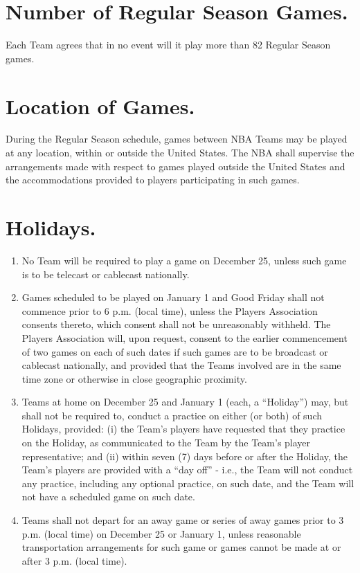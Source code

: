 \documentclass[
]{book}
\providecommand{\tightlist}{%
  \setlength{\itemsep}{0pt}\setlength{\parskip}{0pt}}
\begin{document}
\hypertarget{number-of-regular-season-games.}{%
\section{Number of Regular Season Games.}\label{number-of-regular-season-games.}}

Each Team agrees that in no event will it play more than 82 Regular Season games.

\hypertarget{location-of-games.}{%
\section{Location of Games.}\label{location-of-games.}}

During the Regular Season schedule, games between NBA Teams may be played at any location, within or outside the United States. The NBA shall supervise the arrangements made with respect to games played outside the United States and the accommodations provided to players participating in such games.

\hypertarget{holidays.}{%
\section{Holidays.}\label{holidays.}}

\begin{enumerate}
\def\labelenumi{(\alph{enumi})}
\tightlist
\item
  No Team will be required to play a game on December 25, unless such game is to be telecast or cablecast nationally.
\item
  Games scheduled to be played on January 1 and Good Friday shall not commence prior to 6 p.m. (local time), unless the Players Association consents thereto, which consent shall not be unreasonably withheld. The Players Association will, upon request, consent to the earlier commencement of two games on each of such dates if such games are to be broadcast or cablecast nationally, and provided that the Teams involved are in the same time zone or otherwise in close geographic proximity.
\item
  Teams at home on December 25 and January 1 (each, a ``Holiday'') may, but shall not be required to, conduct a practice on either (or both) of such Holidays, provided: (i) the Team's players have requested that they practice on the Holiday, as communicated to the Team by the Team's player representative; and (ii) within seven (7) days before or after the Holiday, the Team's players are provided with a ``day off'' - i.e., the Team will not conduct any practice, including any optional practice, on such date, and the Team will not have a scheduled game on such date.
\item
  Teams shall not depart for an away game or series of away games prior to 3 p.m. (local time) on December 25 or January 1, unless reasonable transportation arrangements for such game or games cannot be made at or after 3 p.m. (local time).
\end{enumerate}
\end{document}
